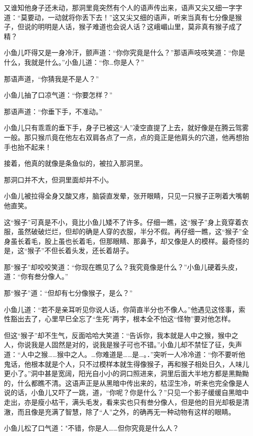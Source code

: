 \documentclass[12pt,oneside]{book}
\begin{document}
又谁知他身子还未动，那洞里竟突然有个人的语声传出来，语声又尖又细一字字道：``莫要动，一动就将你丢下去！''这又尖又细的语声，听来当真有七分像是猴子，但说的明明是人话，猴子难道也会说人话？这峨嵋山里，莫非真有猴子成了精？

小鱼儿吓得又是一身冷汗，颤声道：``你你究竟是什么？''那语声吱吱笑道：``你是什么，我就是什么。''小鱼儿道：``你\ldots 你是人？''

那语声道，``你猜我是不是人？''

小鱼儿抽了口凉气道：``你要怎样？''

那语声道：``你垂下手，不准动。''

小鱼儿只有乖乖的垂下手，身子已被这``人''凌空直提了上去，就好像是在腾云驾雾一般。那只猴爪竟在他左右双肩各点了一点，点的竟正是他肩头的穴道，他再想抬手也抬不起来！

接着，他真的就像是条鱼似的，被拉入那洞里。

那洞口并不大，但洞里面却并不小。

小鱼儿被拉得全身又酸又疼，脑袋直发晕，张开眼睛，只见一只猴子正咧着大嘴朝他直笑。

这``猴子''可真是不小，竟比小鱼儿矮不了许多。仔细一瞧，这``猴子''身上竟穿着衣服，虽然破破烂烂，但却的确是人穿的衣服，半分不假。再仔细一瞧，这``猴子''全身虽长着毛，股上虽也长着毛，但那眼睛、那鼻予，却又像是人的模样。最奇怪的是，这``猴子''不但长着头发，还长着胡子。

那``猴子''却咬咬笑道：``你现在瞧见了么？我究竟像是什么？''小鱼儿硬着头皮，道：``你有叁分像人。''

那``猴子''道：``但却有七分像猴子，是么？''

小鱼儿道：``若不是亲耳听见你说人话，你简直半分也不像人。''他遇见这怪事，索性豁出去了，心里早巳全忘了``生死''两字，根本全不怕这``怪物''要对他怎样。

但这``猴子''却不生气，反面哈哈大笑道：``告诉你，我本就是人中之猴，猴中之人，你说我是人固然是对的，说我是猴子可也不错。''小鱼儿却不禁怔了征，失声道：``人中之猴\ldots\ldots 猴中之人。\ldots 你难道是\ldots\ldots 是\ldots。．''突听一人冷冷道：``你不要听他鬼话，他根本就是个人，只不过模样本就生得像猴子，再和猴子相处日久，人味儿更小了。''洞中甚是宽阔，阳光自小小的洞口照进来，洞里后面大半地方都是黑黝黝的，什么都瞧不清。这语声正是从黑暗中传出来的，枯涩生冷，听来也完全像是人说的话，小鱼儿又吓了一跳，道，``你呢？你是什么？''只见一个影子缓缓自黑暗中走出，亦是瘦小枯干，满头毛发，看来实也只有叁分像人，但是他的目光却极是清澈，而且像是充满了智慧，除了``人''之外，的确再无一种动物有这样的眼睛。

小鱼儿松了口气道："不错，你是人\ldots\ldots 但你究竟是什么人？
\end{document}
